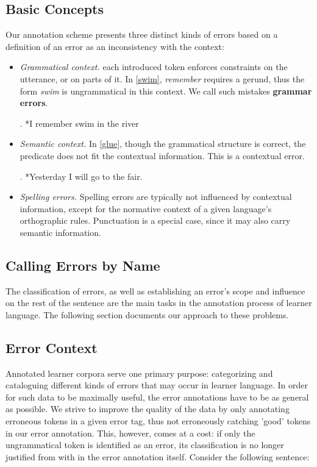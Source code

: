 \documentclass{article}
\begin{document}
\subsection{Basic Concepts}\label{sec:threeholies}

Our annotation scheme presents three distinct kinds of errors based on a
definition of an error as an inconsistency with the context:

\begin{itemize}
  \item \textit{Grammatical context.} each introduced token enforces constraints
  on the utterance, or on parts of it. In \ref{swim}, \textit{remember} requires
  a gerund, thus the form \textit{swim} is ungrammatical in this context. We
  call such mistakes \textbf{grammar errors}.

  \ex. *I remember swim in the river\label{swim}

  \item \textit{Semantic context.}  In \ref{glue}, though the grammatical
  structure is correct, the predicate does not fit the contextual information.
  This is a contextual error.

  \ex. *Yesterday I will go to the fair.\label{glue}

  \item \textit{Spelling errors.} Spelling errors are typically not influenced
  by contextual information, except for the normative context of a given
  language's orthographic rules. Punctuation is a special case, since it may
  also carry semantic information.

  \end{itemize}

\subsection{Calling Errors by Name}\label{sec:taxonomy}

The classification of errors, as well as establishing an error's scope and 
influence on the rest of the sentence are the main tasks in the annotation
process of learner language. The following section documents our approach to
these problems.

\subsection{Error Context}

Annotated learner corpora serve one primary purpose: categorizing and
cataloguing different kinds of errors that may occur in learner language. In
order for such data to be maximally useful, the error annotations have to be as
general as possible. We strive to improve the quality of the data by only
annotating erroneous tokens in a given error tag, thus not erroneously catching
'good' tokens in our error annotation. This, however, comes at a cost: if only
the ungrammatical token is identified as an error, its classification is no
longer justified from with in the error annotation itself. Consider the
following sentence:
\end{document}
